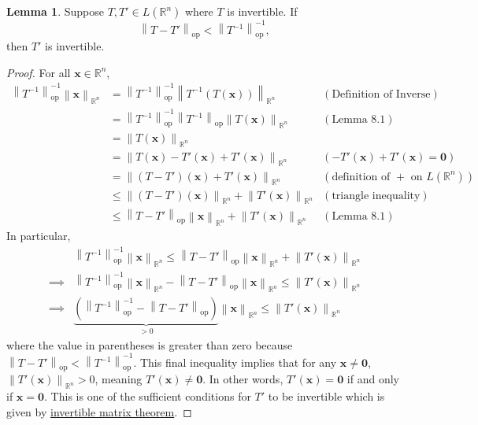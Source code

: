 \documentclass{article}
\newcommand{\R}{\mathbb{R}}
\newcommand{\x}{\mathbf{x}}
\newcommand{\ze}{\mathbf{0}}
\newcommand{\norm}[1]{\left\lVert#1\right\rVert}
\newcommand{\normop}[1]{\left\lVert#1\right\rVert_\text{op}}
\theoremstyle{definition}
\newtheorem{lemma}{Lemma}[section]
\begin{document}
\begin{lemma}
Suppose $ T,T'\in L(\R^n) $ where $ T $ is invertible. If $$ \normop{T-T'}<\normop{T^{-1}}^{-1} ,$$ then $ T' $ is invertible.   
\end{lemma} 
\begin{proof}
	For all $ \x\in\R^n $,
	\begin{align*}
		\normop{T^{-1}}^{-1}\norm{\x}_{\R^n} & = \normop{T^{-1}}^{-1}\norm{T^{-1}(T(\x))}_{\R^n}  & (\text{Definition of Inverse})\\& = \normop{T^{-1}}^{-1}\normop{T^{-1}}\norm{T(\x)}_{\R^n}  & (\text{Lemma } 8.1)\\ & = \norm{T(\x)}_{\R^n} \\ 
		& = \norm{T(\x) - T'(\x) + T'(\x)}_{\R^n} & (- T'(\x) + T'(\x) = \ze ) \\ 
		& = \norm{(T- T')(\x) + T'(\x)}_{\R^n} & (\text{definition of }+\text{ on }L(\R^n)) \\ 
		& \le \norm{(T- T')(\x)}_{\R^n} + \norm{T'(\x)}_{\R^n} & (\text{triangle inequality})
		\\ 
		& \le \normop{T-T'}\norm{\x}_{\R^n} + \norm{T'(\x)}_{\R^n} & (\text{Lemma }8.1)
	\end{align*}
In particular, 
\begin{align*}
	&\normop{T^{-1}}^{-1}\norm{\x}_{\R^n}  \le \normop{T-T'}\norm{\x}_{\R^n} + \norm{T'(\x)}_{\R^n}\\\implies & \normop{T^{-1}}^{-1}\norm{\x}_{\R^n} - \normop{T-T'}\norm{\x}_{\R^n} \le \norm{T'(\x)}_{\R^n}\\ \implies &  \underbrace{\left(\normop{T^{-1}}^{-1} - \normop{T-T'}\right)}_{> 0}\norm{\x}_{\R^n}  \le  \norm{T'(\x)}_{\R^n}
\end{align*}
where the value in parentheses is greater than zero because $ \normop{T-T'}<\normop{T^{-1}}^{-1} $. This final inequality implies that for any $ \x\neq \ze $, $ \norm{T'(\x)}_{\R^n} > 0$, meaning $ T'(\x)\neq \ze $. In other words, $ T'(\x)=\ze $ if and only if $ \x =\ze $. This is one of the sufficient conditions for $ T' $ to be invertible which is given by \href{https://mathworld.wolfram.com/InvertibleMatrixTheorem.html}{invertible matrix theorem}. 
\end{proof}
\end{document}
